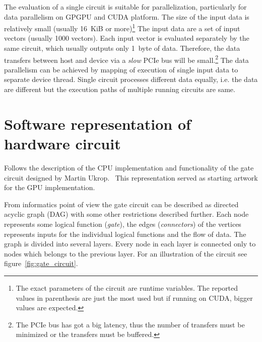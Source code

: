 \documentclass[12pt,oneside]{fithesis2}
\begin{document}
The evaluation of a single circuit is suitable for parallelization, particularly for data parallelism on GPGPU and CUDA platform. The size of the input data is relatively small (usually 16~KiB or more)\footnote{The exact parameters of the circuit are runtime variables. The reported values in parenthesis are just the most used but if running on CUDA, bigger values are expected.} The input data are a set of input vectors (usually 1000 vectors). Each input vector is evaluated separately by the same circuit, which usually outputs only 1~byte of data. Therefore, the data transfers between host and device via a \emph{slow} PCIe bus will be small.\footnote{The PCIe bus has got a big latency, thus the number of transfers must be minimized or the transfers must be buffered.} The data parallelism can be achieved by mapping of execution of single input data to separate device thread. Single circuit processes different data equally, i.e. the data are different but the execution paths of multiple running circuits are same.


\section{Software representation of hardware circuit}

Follows the description of the CPU implementation and functionality of the gate circuit designed by Martin Ukrop.~\cite{ukrop_thesis} This representation served as starting artwork for the GPU implementation.

From informatics point of view the gate circuit can be described as directed acyclic graph (DAG) with some other restrictions described further. Each node represents some logical function (\emph{gate}), the edges (\emph{connectors}) of the vertices represents inputs for the individual logical functions and the flow of data. The graph is divided into several layers. Every node in each layer is connected only to nodes which belongs to the previous layer. For an illustration of the circuit see figure~\ref{fig:gate_circuit}.~\cite{eacirc_circuit}
\end{document}
